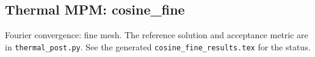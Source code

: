 \subsection{Thermal MPM: cosine\_fine}
Fourier convergence: fine mesh. The reference solution and acceptance metric are in \texttt{thermal\_post.py}. See the generated \texttt{cosine\_fine\_results.tex} for the status.
